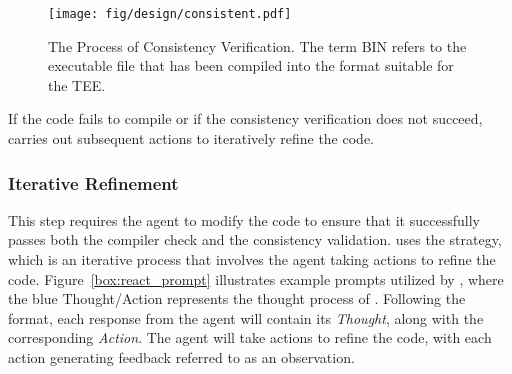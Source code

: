 \begin{figure}[ht]
    \centering
    \texttt{[image: fig/design/consistent.pdf]}
    \caption{The Process of Consistency Verification. The term BIN refers to the executable file that has been compiled into the format suitable for the TEE.}
    \label{fig:system:consistent}
\end{figure}

If the code fails to compile or if the consistency verification does not succeed, \system carries out subsequent  actions to iteratively refine the code.

\subsubsection{Iterative Refinement}
This step requires the agent to modify the code to ensure that it successfully passes both the compiler check and the consistency validation.
\system uses the  strategy, which is an iterative process that involves the agent taking actions to refine the code.
Figure~\ref{box:react_prompt} illustrates example prompts utilized by , where the blue \textcolor{blue!70!black}{{Thought/Action}} represents the thought process of .
Following the  format, each response from the agent will contain its \emph{Thought}, along with the corresponding \emph{Action}. 
The agent will take actions to refine the code, with each action generating feedback referred to as an observation.



